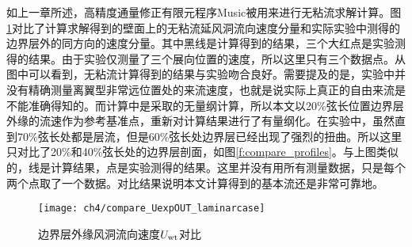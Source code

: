如上一章所述，高精度通量修正有限元程序Music\cite{WangZJ2009,Zhu2016,Zh2017}被用来进行无粘流求解计算。图\ref{f:ConpareInvicidV}对比了计算求解得到的壁面上的无粘流延风洞流向速度分量和实际实验中测得的边界层外的同方向的速度分量。其中黑线是计算得到的结果，三个大红点是实验测得的结果。由于实验仅测量了三个展向位置的速度，所以这里只有三个数据点。从图中可以看到，无粘流计算得到的结果与实验吻合良好。需要提及的是，实验中并没有精确测量离翼型非常远位置处的来流速度，也就是说实际上真正的自由来流是不能准确得知的。而计算中是采取的无量纲计算，所以本文以20\%弦长位置边界层外缘的流速作为参考基准点，重新对计算结果进行了有量纲化。在实验中，虽然直到70\%弦长处都是层流，但是60\%弦长处边界层已经出现了强烈的扭曲。所以这里只对比了20\%和40\%弦长处的边界层剖面，如图\ref{f:compare_profiles}。与上图类似的，线是计算结果，点是实验测得的结果。这里并没有用所有测量数据，只是每个两个点取了一个数据。对比结果说明本文计算得到的基本流还是非常可靠地。
\begin{figure}
\centering
  \texttt{[image: ch4/compare\_UexpOUT\_laminarcase]}
\caption{边界层外缘风洞流向速度$U_{\rm{wt}}$对比}
\label{f:ConpareInvicidV}
\end{figure}

